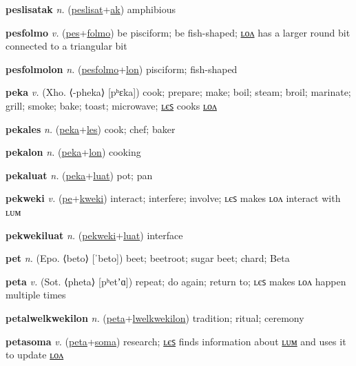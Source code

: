 \textbf{\hypertarget{peslisatak}{peslisatak}} \textit{n.} (\hyperlink{peslisat}{peslisat}+\allowbreak \hyperlink{ak}{ak})
amphibious

\textbf{\hypertarget{pesfolmo}{pesfolmo}} \textit{v.} (\hyperlink{pes}{pes}+\allowbreak \hyperlink{folmo}{folmo})
be pisciform; be fish-shaped; \hyperlink{pesfolmolon}{ʟᴏᴧ} has a larger round bit connected to a triangular bit

\textbf{\hypertarget{pesfolmolon}{pesfolmolon}} \textit{n.} (\hyperlink{pesfolmo}{pesfolmo}+\allowbreak \hyperlink{lon}{lon})
pisciform; fish-shaped

\textbf{\hypertarget{peka}{peka}} \textit{v.} (Xho. ⟨-pheka⟩ [pʰɛka])
cook; prepare; make; boil; steam; broil; marinate; grill; smoke; bake; toast; microwave; \hyperlink{pekales}{ʟєꜱ} cooks \hyperlink{pekalon}{ʟᴏᴧ}

\textbf{\hypertarget{pekales}{pekales}} \textit{n.} (\hyperlink{peka}{peka}+\allowbreak \hyperlink{les}{les})
cook; chef; baker

\textbf{\hypertarget{pekalon}{pekalon}} \textit{n.} (\hyperlink{peka}{peka}+\allowbreak \hyperlink{lon}{lon})
cooking

\textbf{\hypertarget{pekaluat}{pekaluat}} \textit{n.} (\hyperlink{peka}{peka}+\allowbreak \hyperlink{luat}{luat})
pot; pan

\textbf{\hypertarget{pekweki}{pekweki}} \textit{v.} (\hyperlink{pe}{pe}+\allowbreak \hyperlink{kweki}{kweki})
interact; interfere; involve; ʟєꜱ makes ʟᴏᴧ interact with ʟᴜᴍ

\textbf{\hypertarget{pekwekiluat}{pekwekiluat}} \textit{n.} (\hyperlink{pekweki}{pekweki}+\allowbreak \hyperlink{luat}{luat})
interface

\textbf{\hypertarget{pet}{pet}} \textit{n.} (Epo. ⟨beto⟩ [ˈbeto])
beet; beetroot; sugar beet; chard; Beta

\textbf{\hypertarget{peta}{peta}} \textit{v.} (Sot. ⟨pheta⟩ [pʰetʼɑ])
repeat; do again; return to; ʟєꜱ makes ʟᴏᴧ happen multiple times

\textbf{\hypertarget{petalwelkwekilon}{petalwelkwekilon}} \textit{n.} (\hyperlink{peta}{peta}+\allowbreak \hyperlink{lwelkwekilon}{lwelkwekilon})
tradition; ritual; ceremony

\textbf{\hypertarget{petasoma}{petasoma}} \textit{v.} (\hyperlink{peta}{peta}+\allowbreak \hyperlink{soma}{soma})
research; \hyperlink{petasomales}{ʟєꜱ} finds information about \hyperlink{petasomalum}{ʟᴜᴍ} and uses it to update \hyperlink{petasomalon}{ʟᴏᴧ}

